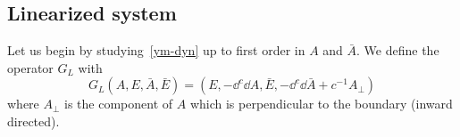 \subsection{Linearized system}
Let us begin by studying~\cref{ym-dyn} up to first order in $A$ and $\bar{A}$. 
We define the operator $G_L$ with
\begin{equation}
G_L (A, E, \bar{A}, \bar{E}) = (E, -\dd^c \dd A, \bar{E}, -\dd^c \dd \bar{A} + c^{-1} A_\bot)
\end{equation}
where $A_\bot$ is the component of $A$ which is perpendicular to the boundary (inward directed). \\\\
